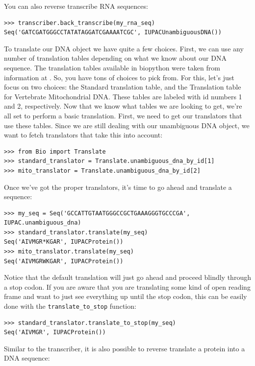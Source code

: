 \documentclass{report}
\begin{document}
You can also reverse transcribe RNA sequences:

\begin{verbatim}
>>> transcriber.back_transcribe(my_rna_seq)
Seq('GATCGATGGGCCTATATAGGATCGAAAATCGC', IUPACUnambiguousDNA())
\end{verbatim}


To translate our DNA object we have quite a few choices. First, we can use any number of translation tables depending on what we know about our DNA sequence. The translation tables available in biopython were taken from information at . So, you have tons of choices to pick from. For this, let's just focus on two choices: the Standard translation table, and the Translation table for Vertebrate Mitochondrial DNA. These tables are labeled with id numbers 1 and 2, respectively. Now that we know what tables we are looking to get, we're all set to perform a basic translation. First, we need to get our translators that use these tables. Since we are still dealing with our unambiguous DNA object, we want to fetch translators that take this into account:

\begin{verbatim}
>>> from Bio import Translate
>>> standard_translator = Translate.unambiguous_dna_by_id[1] 
>>> mito_translator = Translate.unambiguous_dna_by_id[2]
\end{verbatim}

Once we've got the proper translators, it's time to go ahead and translate a sequence:

\begin{verbatim}
>>> my_seq = Seq('GCCATTGTAATGGGCCGCTGAAAGGGTGCCCGA', IUPAC.unambiguous_dna)
>>> standard_translator.translate(my_seq)
Seq('AIVMGR*KGAR', IUPACProtein())
>>> mito_translator.translate(my_seq)
Seq('AIVMGRWKGAR', IUPACProtein())
\end{verbatim}

Notice that the default translation will just go ahead and proceed blindly through a stop codon. If you are aware that you are translating some kind of open reading frame and want to just see everything up until the stop codon, this can be easily done with the \verb|translate_to_stop| function:

\begin{verbatim}
>>> standard_translator.translate_to_stop(my_seq)
Seq('AIVMGR', IUPACProtein())
\end{verbatim}

Similar to the transcriber, it is also possible to reverse translate a protein into a DNA sequence:
\end{document}
